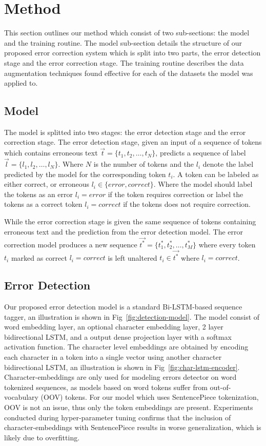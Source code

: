 \section{Method}

This section outlines our method which consist of two sub-sections: the model and the training routine. The model sub-section details the structure of our proposed error correction system which is split into two parts, the error detection stage and the error correction stage. The training routine describes the data augmentation techniques found effective for each of the datasets the model was applied to.

\subsection{Model}

The model is splitted into two stages: the error detection stage and the error correction stage. The error detection stage, given an input of a sequence of tokens which contains erroneous text \(\vec{t} = \{t_{1}, t_{2}, \dots, t_{N}\}\), predicts a sequence of label \(\vec{l} = \{l_{1}, l_{2}, \dots, l_{N}\}\). Where \(N\) is the number of tokens and the \(l_{i}\) denote the label predicted by the model for the corresponding token \(t_{i}\). A token can be labeled as either correct, or erroneous \(l_{i} \in \{error, correct\}\). Where the model should label the tokens as an error \(l_i = error\) if the token requires correction or label the tokens as a correct token \(l_i = correct\) if the tokens does not require correction.

While the error correction stage is given the same sequence of tokens containing erroneous text and the prediction from the error detection model. The error correction model produces a new sequence \(\vec{t^*} = \{t^*_{1}, t^*_{2}, \dots, t^*_{M}\}\) where every token \(t_i\) marked as correct \(l_i = correct\) is left unaltered \(t_i \in \vec{t^*}\) where \(l_i = correct\).

\subsection*{Error Detection}

Our proposed error detection model is a standard Bi-LSTM-based sequence tagger, an illustration is shown in Fig~\ref{fig:detection-model}. The model consist of word embedding layer, an optional character embedding layer, 2 layer bidirectional LSTM, and a output dense projection layer with a softmax activation function. The character level embeddings are obtained by encoding each character in a token into a single vector using another character bidirectional LSTM, an illustration is shown in Fig~\ref{fig:char-lstm-encoder}. Character-embeddings are only used for modeling errors detector on word tokenized sequences, as models based on word tokens suffer from out-of-vocabulary (OOV) tokens. For our model which uses SentencePiece tokenization, OOV is not an issue, thus only the token embeddings are present. Experiments conducted during hyper-parameter tuning confirms that the inclusion of character-embeddings with SentencePiece results in worse generalization, which is likely due to overfitting.

